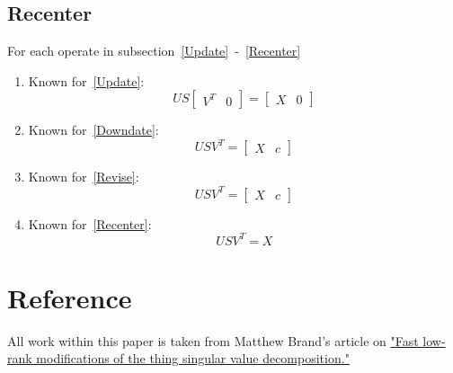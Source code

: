 \documentclass{article}
\begin{document}
\subsection{Recenter\label{Recenter}}

For each operate in subsection~\ref{Update}~-~\ref{Recenter}

\begin{enumerate}
\item Known for~\ref{Update}:
$$US\begin{bmatrix}V^T & 0 \end{bmatrix}= \begin{bmatrix}X & 0\end{bmatrix}$$
\item Known for~\ref{Downdate}:
$$USV^T= \begin{bmatrix}X & c\end{bmatrix}$$
\item Known for~\ref{Revise}:
$$USV^T= \begin{bmatrix}X & c\end{bmatrix}$$
\item Known for~\ref{Recenter}:
$$USV^T= X$$
\end{enumerate}

\section{Reference\label{Reference}}
All work within this paper is taken from Matthew Brand's article on \href{http://www.stat.osu.edu/~dmsl/thinSVDtracking.pdf}{"Fast low-rank modifications of the thing singular value decomposition."}
\end{document}
